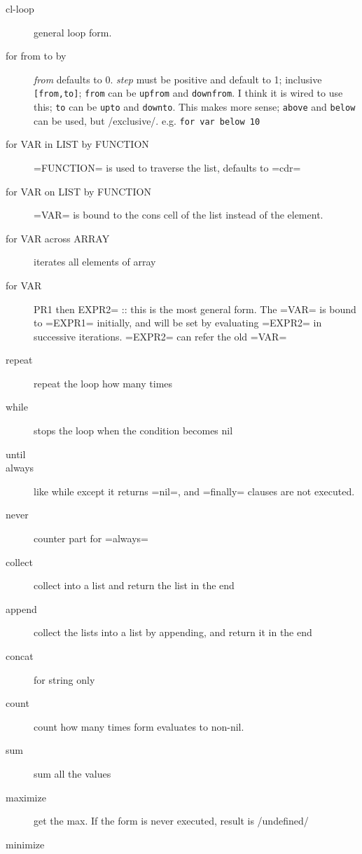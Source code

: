 \begin{description}
\item [cl-loop ] general loop form.
\item [for  from  to  by ]
  \textit{from} defaults to 0. \textit{step} must be positive and default to 1;
  inclusive \texttt{[from,to]};
  \texttt{from} can be \texttt{upfrom} and \texttt{downfrom}. I think it is wired to use this;
  \texttt{to} can be \texttt{upto} and \texttt{downto}. This makes more sense;
  \texttt{above} and \texttt{below} can be used, but /exclusive/. e.g. \texttt{for var below 10}
\item [for VAR in LIST by FUNCTION] =FUNCTION= is used to traverse the list, defaults to =cdr=
\item [for VAR on LIST by FUNCTION] =VAR= is bound to the cons cell of the list instead of the element.
\item [for VAR across ARRAY] iterates all elements of array
\item [for VAR ]PR1 then EXPR2= :: this is the most general form.  The
  =VAR= is bound to =EXPR1= initially, and will be set by evaluating
  =EXPR2= in successive iterations.  =EXPR2= can refer the old =VAR=

\item [repeat ] repeat the loop how many times
\item [while ] stops the loop when the condition becomes nil
\item [until ]
\item [always ] like while except it returns =nil=, and =finally= clauses are not executed.
\item [never ] counter part for =always=

\item [collect ] collect into a list and return the list in the end
\item [append ] collect the lists into a list by appending, and return it in the end
\item [concat ] for string only
\item [count ] count how many times form evaluates to non-nil.
\item [sum ] sum all the values
\item [maximize ] get the max. If the form is never executed, result is /undefined/
\item [minimize ]


\end{description}
